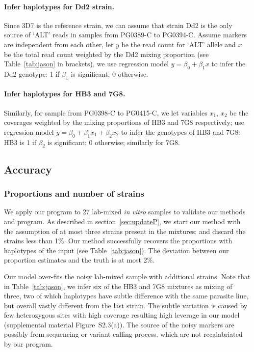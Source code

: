 \documentclass{bioinfo}
\begin{document}
\paragraph{Infer haplotypes for Dd2 strain.}
Since 3D7 is the reference strain, we can assume that strain Dd2 is the only source of `ALT' reads in samples from {\textmd PG0389-C} to {\textmd PG0394-C}. Assume markers are independent from each other, let $y$ be the read count for `ALT' allele and $x$ be the total read count weighted by the Dd2 mixing proportion (see Table~\ref{tab:jason} in brackets), we use regression model $y = \beta_0 + \beta_{1} x$ to infer the Dd2 genotype: 1 if $\beta_{1}$ is significant; 0 otherwise.

\paragraph{Infer haplotypes for HB3 and 7G8.}
Similarly, for sample from {\textmd PG0398-C} to {\textmd PG0415-C}, we let variables $x_1$, $x_2$ be the coverages weighted by the mixing proportions of HB3 and 7G8 respectively; use regression model $y = \beta_0 + \beta_{1} x_1 + \beta_{2} x_2$ to infer the genotypes of HB3 and 7G8: HB3 is 1 if $\beta_{2}$ is significant; 0 otherwise; similarly for 7G8.

\subsection{Accuracy}
\subsubsection{Proportions and number of strains}
We apply our program to 27 lab-mixed {\em in vitro} samples to validate our methods and program. As described in section~\ref{sec:updateP}, we start our method with the assumption of at most three strains present in the mixtures; and discard the strains less than 1\%. Our method successfully recovers the proportions with haplotypes of the input (see Table~\ref{tab:jason}). The deviation between our proportion estimates and the truth is at most 2\%.

Our model over-fits the noisy lab-mixed sample with additional strains. Note that in Table~\ref{tab:jason}, we infer six of the HB3 and 7G8 mixtures as mixing of three, two of which haplotypes have subtle difference with the same parasite line, but overall vastly different from the last strain. The subtle variation is caused by few heterozygous sites with high coverage resulting high leverage in our model (supplemental material Figure~S2.3(a)). The source of the noisy markers are possibly from sequencing or variant calling process, which are not recalabriated by our program.
\end{document}
